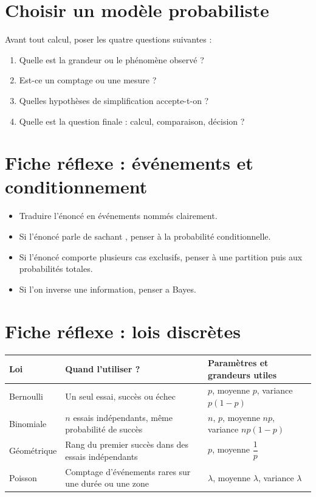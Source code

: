 
\section{Choisir un modèle probabiliste}

\begin{Meth}
Avant tout calcul, poser les quatre questions suivantes :
\begin{enumerate}
    \item Quelle est la grandeur ou le phénomène observé ?
    \item Est-ce un comptage ou une mesure ?
    \item Quelles hypothèses de simplification accepte-t-on ?
    \item Quelle est la question finale : calcul, comparaison, décision ?
\end{enumerate}
\end{Meth}

\section{Fiche réflexe : événements et conditionnement}

\begin{itemize}
    \item Traduire l'énoncé en événements nommés clairement.
    \item Si l'énoncé parle de \og sachant \fg{}, penser à la probabilité conditionnelle.
    \item Si l'énoncé comporte plusieurs cas exclusifs, penser à une partition puis aux probabilités totales.
    \item Si l'on inverse une information, penser a Bayes.
\end{itemize}

\section{Fiche réflexe : lois discrètes}

\begin{center}
\renewcommand{\arraystretch}{1.5}
\begin{tabular}{|m{3cm}|m{4.5cm}|m{4.8cm}|}
\hline
\textbf{Loi} & \textbf{Quand l'utiliser ?} & \textbf{Paramètres et grandeurs utiles} \\
\hline
Bernoulli & Un seul essai, succès ou échec & $p$, moyenne $p$, variance $p(1-p)$ \\
\hline
Binomiale & $n$ essais indépendants, même probabilité de succès & $n$, $p$, moyenne $np$, variance $np(1-p)$ \\
\hline
Géométrique & Rang du premier succès dans des essais indépendants & $p$, moyenne $\dfrac{1}{p}$ \\
\hline
Poisson & Comptage d'événements rares sur une durée ou une zone & $\lambda$, moyenne $\lambda$, variance $\lambda$ \\
\hline
\end{tabular}
\end{center}

